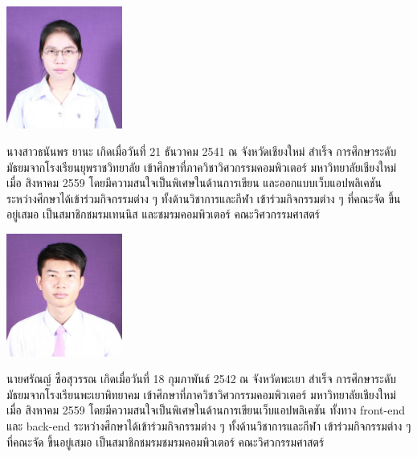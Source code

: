 \documentclass[final]{cpecmu}
\author{นางสาวธนันพร ยานะ}{Tananporn Yana}{600610739}
\author{นายศรัณญ์ ซือสุวรรณ}{Sarun Suesuwan}{600610777}
\begin{document}


\pagestyle{empty}\cleardoublepage
\normalspacing \setcounter{page}{1}  \pagestyle{cpecmu}









\ifproject
\appendix


\ifglossary\glossarypage\fi

\ifindex\indexpage\fi

\begin{biosketch}
  \begin{center}
    \includegraphics[width=1.5in]{images/tananporn.jpg}
  \end{center}
  
  นางสาวธนันพร ยานะ เกิดเมื่อวันที่ 21 ธันวาคม 2541 ณ จังหวัดเชียงใหม่ สำเร็จ
  การศึกษาระดับมัธยมจากโรงเรียนยุพราชวิทยาลัย เข้าศึกษาที่ภาควิชาวิศวกรรมคอมพิวเตอร์
  มหาวิทยาลัยเชียงใหม่ เมื่อ สิงหาคม 2559 โดยมีความสนใจเป็นพิเศษในด้านการเขียน และออกแบบเว็บแอปพลิเคชัน
  ระหว่างศึกษาได้เข้าร่วมกิจกรรมต่าง ๆ ทั้งด้านวิชาการและกีฬา เข้าร่วมกิจกรรมต่าง ๆ ที่คณะจัด
  ขึ้นอยู่เสมอ เป็นสมาชิกชมรมเทนนิส และชมรมคอมพิวเตอร์ คณะวิศวกรรมศาสตร์
\end{biosketch}

\begin{biosketch}
  \begin{center}
    \includegraphics[width=1.5in]{images/sarun.jpg}
  \end{center}
  
  นายศรัณญ์ ซือสุวรรณ เกิดเมื่อวันที่ 18 กุมภาพันธ์ 2542 ณ จังหวัดพะเยา สำเร็จ
  การศึกษาระดับมัธยมจากโรงเรียนพะเยาพิทยาคม เข้าศึกษาที่ภาควิชาวิศวกรรมคอมพิวเตอร์
  มหาวิทยาลัยเชียงใหม่ เมื่อ สิงหาคม 2559 โดยมีความสนใจเป็นพิเศษในด้านการเขียนเว็บแอปพลิเคชัน ทั้งทาง front-end และ back-end
  ระหว่างศึกษาได้เข้าร่วมกิจกรรมต่าง ๆ ทั้งด้านวิชาการและกีฬา เข้าร่วมกิจกรรมต่าง ๆ ที่คณะจัด
  ขึ้นอยู่เสมอ เป็นสมาชิกชมรมชมรมคอมพิวเตอร์ คณะวิศวกรรมศาสตร์
\end{biosketch}
\fi %
\end{document}
